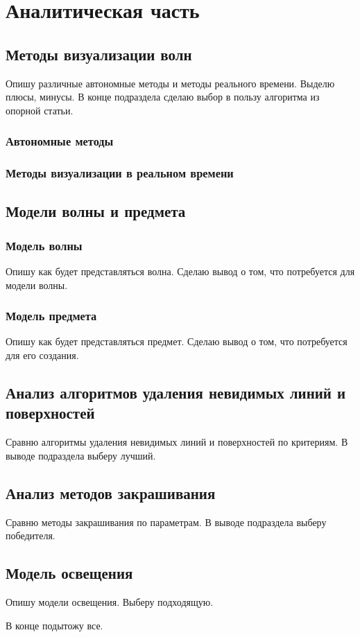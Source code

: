 \chapter{Аналитическая часть}

\section{Методы визуализации волн}

Опишу различные автономные методы и методы реального времени. Выделю плюсы, минусы. В конце подраздела сделаю выбор в пользу алгоритма из опорной статьи.

\subsection{Автономные методы}

\subsection{Методы визуализации в реальном времени}

\section{Модели волны и предмета}

\subsection{Модель волны}

Опишу как будет представляться волна. Сделаю вывод о том, что потребуется для модели волны.

\subsection{Модель предмета}

Опишу как будет представляться предмет. Сделаю вывод о том, что потребуется для его создания.

\section{Анализ алгоритмов удаления невидимых линий и поверхностей}

Сравню алгоритмы удаления невидимых линий и поверхностей по критериям. В выводе подраздела выберу лучший.

\section{Анализ методов закрашивания}

Сравню методы закрашивания по параметрам. В выводе подраздела выберу победителя.

\section{Модель освещения}

Опишу модели освещения. Выберу подходящую.

В конце подытожу все.